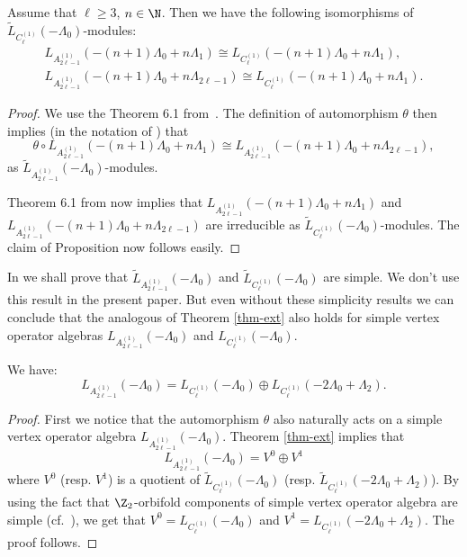 \documentclass[pdftex]{sigma}
\begin{document}
\begin{proposition}
Assume that $\ell \geq 3$, $n \in {\N}$. Then we have the following
isomorphisms of $\widetilde{L} _{C_{\ell} ^ {(1)} }
(-\Lambda_0)$-modules:
\begin{gather*}
{L}_{A_{2 \ell -1} ^{(1)}} (-(n+1) \Lambda_0 + n \Lambda_1) \cong
L_{C_{\ell} ^{(1)}} (-(n+1) \Lambda_0 + n \Lambda_1), \\
 {L}_{A_{2 \ell -1} ^{(1)}} (-(n+1) \Lambda_0 + n \Lambda_{2\ell -1}
) \cong L_{C_{\ell} ^{(1)}} (-(n+1) \Lambda_0 + n \Lambda_1).
\end{gather*}
\end{proposition}
\begin{proof} We use the Theorem 6.1 from~\cite{DM}.  The def\/inition of automorphism $\theta$ then implies (in
the notation of \cite{DM}) that \[ \theta \circ {L}_{A_{2 \ell -1}
^{(1)}} (-(n+1) \Lambda_0 + n \Lambda_1) \cong {L}_{A_{2 \ell -1}
^{(1)}} (-(n+1) \Lambda_0 + n \Lambda_{2\ell -1} ), \]
as $\widetilde{L}_{A_{2 \ell -1} ^{(1)}} (-\Lambda_0)$-modules.

Theorem 6.1 from \cite{DM} now implies that ${L}_{A_{2 \ell -1}
^{(1)}} (-(n+1) \Lambda_0 + n \Lambda_1)$ and ${L}_{A_{2 \ell -1}
^{(1)}} (-(n+1) \Lambda_0 + n \Lambda_{2\ell -1} )$ are irreducible
as $\widetilde{L} _{C_{\ell} ^ {(1)} } (-\Lambda_0)$-modules. The
claim of Proposition now follows easily.
\end{proof}


 In \cite{AP-2012} we shall prove that   $\widetilde{L}_{A_{2 \ell -1} ^{(1)}} (-\Lambda_0)$ and  $\widetilde{L}_{C_{\ell} ^{(1)}}
(-\Lambda_0)$ are simple. We don't use this result in the present
paper. But even without these simplicity results we can conclude
that the analogous of Theorem \ref{thm-ext} also holds for simple
vertex operator algebras ${L}_{A_{2 \ell -1} ^{(1)}} (-\Lambda_0)$
and $L_{C_{\ell} ^{(1)}} (-\Lambda_0)$.


\begin{corollary} \label{coro-orbifold} We have:
 \[ L_{A_{2 \ell -1} ^{(1)}} (-\Lambda_0) =  L _{C_{\ell} ^{(1)}}
(-\Lambda_0) \oplus  L _{C_{\ell} ^{(1)}} (-2\Lambda_0 +
\Lambda_2).\]
\end{corollary}

\begin{proof}
First we notice that the automorphism $\theta$ also naturally acts
on a simple vertex operator algebra ${L}_{A_{2 \ell -1} ^{(1)}}
(-\Lambda_0)$.  Theorem \ref{thm-ext} implies that \[ {L}_{A_{2 \ell
-1} ^{(1)}} (-\Lambda_0) = V ^0 \oplus V ^1 \] where $V^0$ (resp.
$V^1$) is a quotient of $\widetilde{L}_{C_{\ell} ^{(1)}}
(-\Lambda_0)$ (resp. $\widetilde{L}_{C_{\ell} ^{(1)}} (-2\Lambda_0 +
\Lambda_2)$). By using the fact that ${\Z}_2$-orbifold components
of simple vertex operator algebra are simple (cf.~\cite{DM}), we get
that
$V ^0 =  L _{C_{\ell} ^{(1)}} (-\Lambda_0)$ and $V ^1 =L_{C_{\ell}
^{(1)}} (-2\Lambda_0 + \Lambda_2)$. The proof follows.
 \end{proof}
\end{document}
